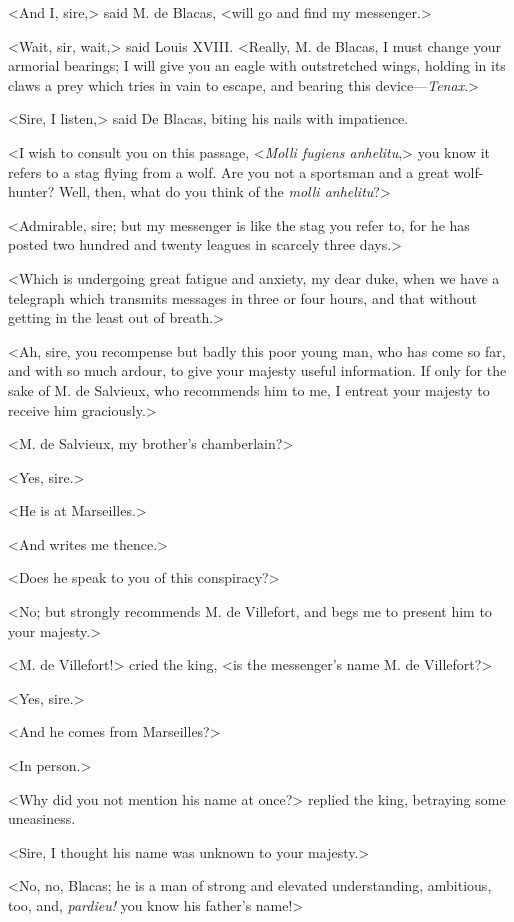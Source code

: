  <And I, sire,> said M. de Blacas, <will go and find my messenger.> 

 <Wait, sir, wait,> said Louis XVIII. <Really, M. de Blacas, I must change your armorial bearings; I will give you an eagle with outstretched wings, holding in its claws a prey which tries in vain to escape, and bearing this device—\textit{Tenax}.>  
 
 <Sire, I listen,> said De Blacas, biting his nails with impatience. 

 <I wish to consult you on this passage, <\textit{Molli fugiens anhelitu},> you know it refers to a stag flying from a wolf. Are you not a sportsman and a great wolf-hunter? Well, then, what do you think of the \textit{molli anhelitu}?> 

 <Admirable, sire; but my messenger is like the stag you refer to, for he has posted two hundred and twenty leagues in scarcely three days.> 

 <Which is undergoing great fatigue and anxiety, my dear duke, when we have a telegraph which transmits messages in three or four hours, and that without getting in the least out of breath.> 

 <Ah, sire, you recompense but badly this poor young man, who has come so far, and with so much ardour, to give your majesty useful information. If only for the sake of M. de Salvieux, who recommends him to me, I entreat your majesty to receive him graciously.> 

 <M. de Salvieux, my brother's chamberlain?> 

 <Yes, sire.> 

 <He is at Marseilles.> 

 <And writes me thence.> 

 <Does he speak to you of this conspiracy?> 

 <No; but strongly recommends M. de Villefort, and begs me to present him to your majesty.> 

 <M. de Villefort!> cried the king, <is the messenger's name M. de Villefort?> 

 <Yes, sire.> 

 <And he comes from Marseilles?> 

 <In person.> 

 <Why did you not mention his name at once?> replied the king, betraying some uneasiness. 

 <Sire, I thought his name was unknown to your majesty.> 

 <No, no, Blacas; he is a man of strong and elevated understanding, ambitious, too, and, \textit{pardieu!} you know his father's name!> 

